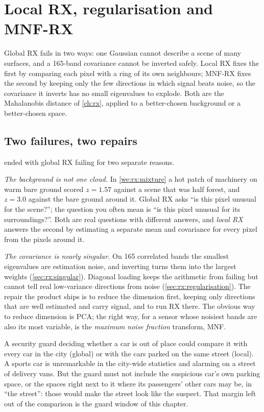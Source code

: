 \chapter{Local RX, regularisation and MNF-RX}\label{ch:localrx}

\begin{onething}
Global RX fails in two ways: one Gaussian cannot describe a scene of many surfaces, and a 165-band
covariance cannot be inverted safely. Local RX fixes the first by comparing each pixel with a ring of
its own neighbours; MNF-RX fixes the second by keeping only the few directions in which signal beats
noise, so the covariance it inverts has no small eigenvalues to explode. Both are the Mahalanobis
distance of \cref{ch:rx}, applied to a better-chosen background or a better-chosen space.
\end{onething}

\section{Two failures, two repairs}\label{sec:localrx:motivation}

 ended with global RX failing for two separate reasons.

\emph{The background is not one cloud.} In \cref{we:rx:mixture} a hot patch of machinery on warm bare
ground scored $z = 1.57$ against a scene that was half forest, and $z = 3.0$ against the bare ground
around it. Global RX asks ``is this pixel unusual for the scene?''; the question you often mean is
``is this pixel unusual for its surroundings?''. Both are real questions with different answers, and
\emph{local RX} answers the second by estimating a separate mean and covariance for
every pixel from the pixels around it.

\emph{The covariance is nearly singular.} On 165 correlated bands the smallest eigenvalues are
estimation noise, and inverting turns them into the largest weights (\cref{sec:rx:singular}). Diagonal
loading keeps the arithmetic from failing but cannot tell real low-variance directions from noise
(\cref{sec:rx:regularisation}). The repair the product ships is to reduce the dimension first, keeping
only directions that are well estimated and carry signal, and to run RX there. The obvious way to
reduce dimension is PCA; the right way, for a sensor whose noisiest bands are also its most variable,
is the \emph{maximum noise fraction} transform, MNF.

\begin{analogy}
A security guard deciding whether a car is out of place could compare it with every car in the city
(global) or with the cars parked on the same street (local). A sports car is unremarkable in the
city-wide statistics and alarming on a street of delivery vans. But the guard must not include the
suspicious car's own parking space, or the spaces right next to it where its passengers' other cars
may be, in ``the street'': those would make the street look like the suspect. That margin left out of
the comparison is the guard window of this chapter.
\end{analogy}

